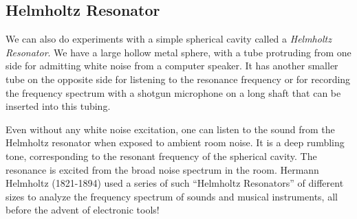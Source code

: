 \documentclass[11pt]{NSF}
\begin{document}
\subsection{Helmholtz Resonator}

We can also do experiments with a simple spherical cavity 
called a {\em Helmholtz Resonator}. 
We have a large hollow metal sphere, with a tube protruding 
from one side for admitting white noise from a computer speaker. 
It has another smaller tube on the opposite side for 
listening to the resonance frequency or for recording the 
frequency spectrum with a shotgun microphone on a long shaft 
that can be inserted into this tubing.

Even without any white noise excitation, one can listen to 
the sound from the Helmholtz resonator when exposed to ambient 
room noise.
It is a deep rumbling tone, corresponding to the resonant 
frequency of the spherical cavity. 
The resonance is excited from the broad noise spectrum in the room. 
Hermann Helmholtz (1821-1894) used a series of such 
``Helmholtz Resonators” of different sizes to analyze the 
frequency spectrum of sounds and musical instruments, 
all before the advent of electronic tools!
\end{document}
